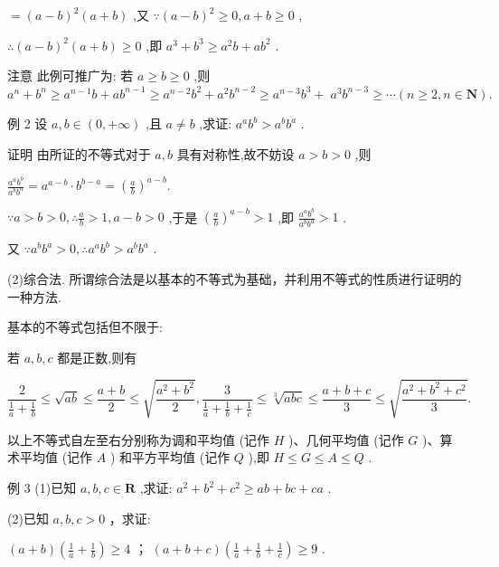 \documentclass[10pt]{article}
\newcommand*\circled[1]{\tikz[baseline=(char.base)]{\node[shape=circle,draw,inner sep=1.5pt] (char) {\small #1};}}
\begin{document}
\(= {\left( a - b\right) }^{2}\left( {a + b}\right)\) ,又 \(\because {\left( a - b\right) }^{2} \geq  0,a + b \geq  0\) ,

\(\therefore {\left( a - b\right) }^{2}\left( {a + b}\right)  \geq  0\) ,即 \({a}^{3} + {b}^{3} \geq  {a}^{2}b + a{b}^{2}\) .

注意 此例可推广为: 若 \(a \geq  b \geq  0\) ,则 \({a}^{n} + {b}^{n} \geq  {a}^{n - 1}b + a{b}^{n - 1} \geq  {a}^{n - 2}{b}^{2} + {a}^{2}{b}^{n - 2} \geq  {a}^{n - 3}{b}^{3} + \; {a}^{3}{b}^{n - 3} \geq  \cdots \left( {n \geq  2,n \in  \mathbf{N}}\right) .\)

例 2 设 \(a,b \in  \left( {0, + \infty }\right)\) ,且 \(a \neq  b\) ,求证: \({a}^{a}{b}^{b} > {a}^{b}{b}^{a}\) .

证明 由所证的不等式对于 \(a,b\) 具有对称性,故不妨设 \(a > b > 0\) ,则

\(\frac{{a}^{a}{b}^{b}}{{a}^{b}{b}^{a}} = {a}^{a - b} \cdot  {b}^{b - a} = {\left( \frac{a}{b}\right) }^{a - b}.\)

\(\because a > b > 0,\therefore \frac{a}{b} > 1,a - b > 0\) ,于是 \({\left( \frac{a}{b}\right) }^{a - b} > 1\) ,即 \(\frac{{a}^{a}{b}^{b}}{{a}^{b}{b}^{a}} > 1\) .

又 \(\because {a}^{b}{b}^{a} > 0,\therefore {a}^{a}{b}^{b} > {a}^{b}{b}^{a}\) .

(2)综合法. 所谓综合法是以基本的不等式为基础，并利用不等式的性质进行证明的一种方法.

基本的不等式包括但不限于:

若 \(a,b,c\) 都是正数,则有

\[
\frac{2}{\frac{1}{a} + \frac{1}{b}} \leq  \sqrt{ab} \leq  \frac{a + b}{2} \leq  \sqrt{\frac{{a}^{2} + {b}^{2}}{2}},\frac{3}{\frac{1}{a} + \frac{1}{b} + \frac{1}{c}} \leq  \sqrt[3]{abc} \leq  \frac{a + b + c}{3} \leq  \sqrt{\frac{{a}^{2} + {b}^{2} + {c}^{2}}{3}}.
\]

以上不等式自左至右分别称为调和平均值 (记作 \(H\) )、几何平均值 (记作 \(G\) )、算术平均值 (记作 \(A\) ) 和平方平均值 (记作 \(Q\) ),即 \(H \leq  G \leq  A \leq  Q\) .

例 3 (1)已知 \(a,b,c \in  \mathbf{R}\) ,求证: \({a}^{2} + {b}^{2} + {c}^{2} \geq  {ab} + {bc} + {ca}\) .

(2)已知 \(a,b,c > 0\) ，求证:

 \circled{1}  \(\left( {a + b}\right) \left( {\frac{1}{a} + \frac{1}{b}}\right)  \geq  4\) ；  \circled{2}  \(\left( {a + b + c}\right) \left( {\frac{1}{a} + \frac{1}{b} + \frac{1}{c}}\right)  \geq  9\) .
\end{document}
